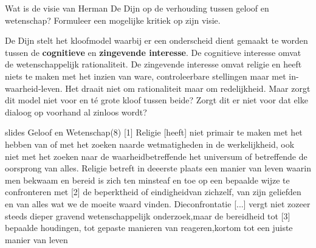 \documentclass[main.tex]{subfiles}
\begin{document}
\begin{examenvraag}
    \begin{vraag}
        Wat is de visie van Herman De Dijn op de verhouding tussen geloof en wetenschap? Formuleer een mogelijke kritiek op zijn visie.
    \end{vraag}

    \begin{antwoord}
	De Dijn stelt het kloofmodel waarbij er een onderscheid dient gemaakt te 
	worden tussen de \textbf{cognitieve} en \textbf{zingevende interesse}.‭ ‬De 
	cognitieve 
	interesse omvat de wetenschappelijk rationaliteit.‭ ‬De zingevende 
	interesse omvat religie en heeft niets te maken met het inzien van ware,‭ 
	‬controleerbare stellingen maar met in-waarheid-leven.‭ ‬Het draait niet om 
	rationaliteit maar om redelijkheid.‭ ‬Maar zorgt dit model niet voor en té 
	grote kloof tussen beide‭? ‬Zorgt dit er niet voor dat elke dialoog op 
	voorhand al zinloos wordt‭?	
    		\begin{citaat}{slides Geloof en Wetenschap(8)}
    			[1] Religie [heeft] niet primair te maken met het hebben van of met het zoeken naarde wetmatigheden in de werkelijkheid, ook niet met het zoeken naar de waarheidbetreffende het universum of betreffende de oorsprong van alles. Religie betreft in deeerste plaats een manier van leven waarin men bekwaam en bereid is zich ten minsteaf en toe op een bepaalde wijze te confronteren met [2] de beperktheid of eindigheidvan zichzelf, van zijn geliefden en van alles wat we de moeite waard vinden. Dieconfrontatie [...] vergt niet zozeer steeds dieper gravend wetenschappelijk onderzoek,maar de bereidheid tot [3] bepaalde houdingen, tot gepaste manieren van reageren,kortom tot een juiste manier van leven
    		\end{citaat}
    	
    \end{antwoord}
\end{examenvraag}
\end{document}
